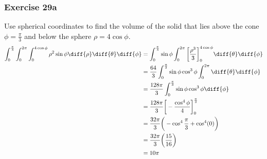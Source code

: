 \documentclass{math}
\begin{document}
\subsubsection*{Exercise 29a}
Use spherical coordinates to find the volume of the solid that lies above the
cone \( \phi = \frac{\pi}{3} \) and below the sphere \( \rho = 4\cos\phi \).
\begin{align*}
  \int_{0}^{\frac{\pi}{3}}\int_{0}^{2\pi}\int_{0}^{4\cos\phi}\rho^2\sin\phi
    \diff{\rho}\diff{\theta}\diff{\phi} &=
    \int_{0}^{\frac{\pi}{3}}\sin\phi\int_{0}^{2\pi}
    \bigg[\frac{\rho^{3}}{3}\bigg]_{0}^{4\cos\phi}
    \diff{\theta}\diff{\phi} \\
  &= \frac{64}{3}\int_{0}^{\frac{\pi}{3}}\sin\phi\cos^3\phi\int_{0}^{2\pi}
    \diff{\theta}\diff{\phi} \\
  &= \frac{128\pi}{3}\int_{0}^{\frac{\pi}{3}}\sin\phi\cos^3\phi\diff{\phi} \\
  &= \frac{128\pi}{3}\bigg[-\frac{\cos^4\phi}{4}\bigg]_{0}^{\frac{\pi}{3}} \\
  &= \frac{32\pi}{3}\bigg(-\cos^4\frac{\pi}{3}+\cos^4(0)\bigg) \\
  &= \frac{32\pi}{3}\bigg(\frac{15}{16}\bigg) \\
  &= 10\pi
\end{align*}
\end{document}
